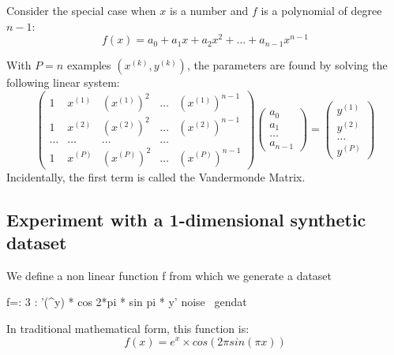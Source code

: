 \documentclass[10pt]{article}%
\begin{document}
Consider the special case when $x$ is a number and $f$ is a polynomial of degree $n-1$:
\[
f(x) = a_0 + a_1 x + a_2 x^2 + \dots + a_{n-1}x^{n-1}
\]

With $P=n$ examples $\left(x^{(k)},y^{(k)}\right)$, the parameters are found by
solving the following linear system:
\begin{equation}
\left( \begin{array}{ccccc}
1 & x^{(1)} & (x^{(1)})^2 & \dots & (x^{(1)})^{n-1} \\
1 & x^{(2)} & (x^{(2)})^2 & \dots & (x^{(2)})^{n-1} \\
\dots & \dots & \dots & \dots \\
1 & x^{(P)} & (x^{(P)})^2 & \dots & (x^{(P)})^{n-1}
\end{array} \right)
\left( \begin{array}{c}
a_0 \\ a_1 \\ \dots \\ a_{n-1} 
\end{array} \right)
=
\left( \begin{array}{c}
y^{(1)} \\ y^{(2)} \\ \dots \\ y^{(P)} 
\end{array} \right)
\label{eqn:vandermonde}
\end{equation}
Incidentally, the first term is called the Vandermonde Matrix.

\subsection{Experiment with a 1-dimensional synthetic dataset}
We define a non linear function {\Tt{}f\nwendquote} from which we generate a dataset

\endmoddef\nwstartdeflinemarkup{}\nwenddeflinemarkup
f=: 3 : '(^y) * cos 2*pi * sin pi * y'
\LA{}noise~{\nwtagstyle{}}\RA{}
\LA{}gendat~{\nwtagstyle{}}\RA{}

\nwendcode{}\nwdocspar
In traditional mathematical form, this function is: 
\[f(x)=e^x \times cos\left(2\pi sin\left(\pi x\right)\right)\]
\end{document}
